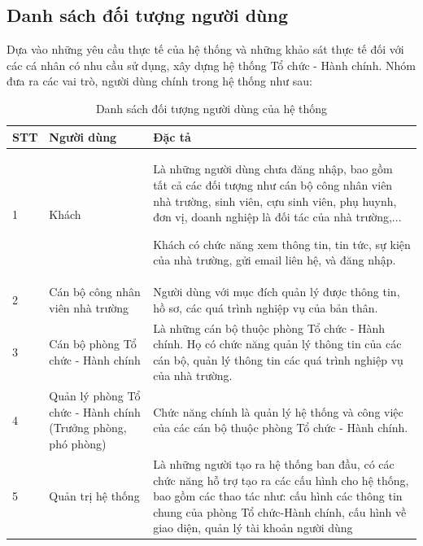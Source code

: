 \subsection{Danh sách đối tượng người dùng}
Dựa vào những yêu cầu thực tế của hệ thống và những khảo sát thực tế đối với các cá nhân có nhu cầu sử dụng, xây dựng hệ thống Tổ chức - Hành chính. Nhóm đưa ra các vai trò, người dùng chính trong hệ thống như sau:
\begin{table}[H]
    \centering
	\begin{tabular}{|p{1cm}|p{4cm}|p{10cm}|}
    \hline
    \textbf{STT}&\textbf{Người dùng}&\textbf{Đặc tả}\\
    \hline
    1&Khách&Là những người dùng chưa đăng nhập, bao gồm tất cả các đối tượng như cán bộ công nhân viên nhà trường, sinh viên, cựu sinh viên, phụ huynh, đơn vị, doanh nghiệp là đối tác của nhà trường,...
    
    Khách có chức năng xem thông tin, tin tức, sự kiện của nhà trường, gửi email liên hệ, và đăng nhập.\\
    \hline
	2&Cán bộ công nhân viên nhà trường&Người dùng với mục đích quản lý được thông tin, hồ sơ, các quá trình nghiệp vụ của bản thân.\\
	\hline
    3&Cán bộ phòng Tổ chức - Hành chính&Là những cán bộ thuộc phòng Tổ chức - Hành chính. Họ có chức năng quản lý thông tin của các cán bộ, quản lý thông tin các quá trình nghiệp vụ của nhà trường.\\
    \hline
    4&Quản lý phòng Tổ chức - Hành chính (Trưởng phòng, phó phòng) &Chức năng chính là quản lý hệ thống và công việc của các cán bộ thuộc phòng Tổ chức - Hành chính. \\
	\hline
    5&Quản trị hệ thống&Là những người tạo ra hệ thống ban đầu, có các chức năng hỗ trợ tạo ra các cấu hình cho hệ thống, bao gồm các thao tác như: cấu hình các thông tin chung của phòng Tổ chức-Hành chính, cấu hình về giao diện, quản lý tài khoản người dùng\\
	\hline
\end{tabular}
\caption{Danh sách đối tượng người dùng của hệ thống}
\end{table}
